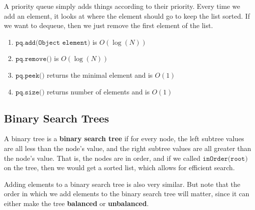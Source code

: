 \documentclass{article}
\begin{document}
    \begin{definition}
      A priority queue simply adds things according to their priority. Every time we add an element, it looks at where the element should go to keep the list sorted. If we want to dequeue, then we just remove the first element of the list. 
      \begin{enumerate}
        \item $\texttt{pq.add(Object element)}$ is $O(\log(N))$
        \item $\texttt{pq.remove()}$ is $O(\log(N))$ 
        \item $\texttt{pq.peek()}$ returns the minimal element and is $O(1)$
        \item $\texttt{pq.size()}$ returns number of elements and is $O(1)$
      \end{enumerate}
    \end{definition}

  \subsection{Binary Search Trees}

    \begin{definition}
      A binary tree is a \textbf{binary search tree} if for every node, the left subtree values are all less than the node's value, and the right subtree values are all greater than the node's value. That is, the nodes are in order, and if we called $\texttt{inOrder(root)}$ on the tree, then we would get a sorted list, which allows for efficient search. 
    \end{definition}

    Adding elements to a binary search tree is also very similar. But note that the order in which we add elements to the binary search tree will matter, since it can either make the tree \textbf{balanced} or \textbf{unbalanced}. 
\end{document}
